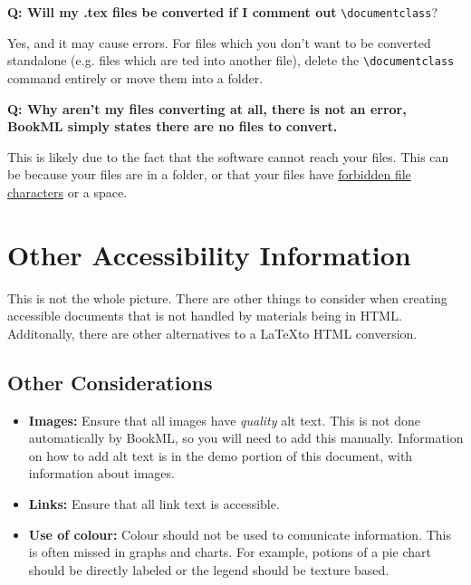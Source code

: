\noindent\textbf{Q: Will my .tex files be converted if I comment out} \verb|\|\verb|documentclass|? 
\begin{ans}
    Yes, and it may cause errors. For files which you don't want to be converted standalone (e.g. files which are \verb||ted into another file), delete the \verb|\|\verb|documentclass| command entirely or move them into a folder.
\end{ans}

\noindent\textbf{Q: Why aren't my files converting at all, there is not an error, BookML simply states there are no files to convert.} 
\begin{ans}
    This is likely due to the fact that the software cannot reach your files. This can be because your files are in a folder, or that your files have \href{https://stackoverflow.com/questions/1976007/what-characters-are-forbidden-in-windows-and-linux-directory-names}{forbidden file characters} or a space.
    
\end{ans}

\section{Other Accessibility Information}
\label{sec:otheraccessibility}

This is not the whole picture. There are other things to consider when creating accessible documents that is not handled by materials being in HTML. Additonally, there are other alternatives to a \LaTeX to HTML conversion. 

\subsection{Other Considerations}
\label{ssec:otheraccessibility}

\begin{itemize}
    \item \textbf{Images:} Ensure that all images have \textit{quality} alt text. This is not done automatically by BookML, so you will need to add this manually. Information on how to add alt text is in the demo portion of this document, with information about images.
    \item \textbf{Links:} Ensure that all link text is accessible.
    \item \textbf{Use of colour:} Colour should not be used to comunicate information. This is often missed in graphs and charts. For example, potions of a pie chart should be directly labeled or the legend should be texture based.
\end{itemize}

